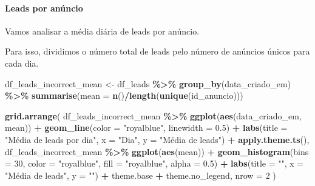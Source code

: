 \documentclass[
]{article}
\newenvironment{Shaded}{\begin{snugshade}}{\end{snugshade}}
\newcommand{\AttributeTok}[1]{\textcolor[rgb]{0.13,0.29,0.53}{#1}}
\newcommand{\DecValTok}[1]{\textcolor[rgb]{0.00,0.00,0.81}{#1}}
\newcommand{\FloatTok}[1]{\textcolor[rgb]{0.00,0.00,0.81}{#1}}
\newcommand{\FunctionTok}[1]{\textcolor[rgb]{0.13,0.29,0.53}{\textbf{#1}}}
\newcommand{\NormalTok}[1]{#1}
\newcommand{\OtherTok}[1]{\textcolor[rgb]{0.56,0.35,0.01}{#1}}
\newcommand{\SpecialCharTok}[1]{\textcolor[rgb]{0.81,0.36,0.00}{\textbf{#1}}}
\newcommand{\StringTok}[1]{\textcolor[rgb]{0.31,0.60,0.02}{#1}}
\begin{document}
\paragraph{Leads por anúncio}\label{leads-por-anuxfancio}

Vamos analisar a média diária de leads por anúncio.

Para isso, dividimos o número total de leads pelo número de anúncios
únicos para cada dia.

\begin{Shaded}
\begin{Highlighting}[]
\NormalTok{df\_leads\_incorrect\_mean }\OtherTok{\textless{}{-}}\NormalTok{ df\_leads }\SpecialCharTok{\%\textgreater{}\%}
  \FunctionTok{group\_by}\NormalTok{(data\_criado\_em) }\SpecialCharTok{\%\textgreater{}\%}
  \FunctionTok{summarise}\NormalTok{(}\AttributeTok{mean =} \FunctionTok{n}\NormalTok{()}\SpecialCharTok{/}\FunctionTok{length}\NormalTok{(}\FunctionTok{unique}\NormalTok{(id\_anuncio)))}

\FunctionTok{grid.arrange}\NormalTok{(}
\NormalTok{  df\_leads\_incorrect\_mean }\SpecialCharTok{\%\textgreater{}\%}
    \FunctionTok{ggplot}\NormalTok{(}\FunctionTok{aes}\NormalTok{(data\_criado\_em, mean)) }\SpecialCharTok{+}
    \FunctionTok{geom\_line}\NormalTok{(}\AttributeTok{color =} \StringTok{"royalblue"}\NormalTok{, }\AttributeTok{linewidth =} \FloatTok{0.5}\NormalTok{) }\SpecialCharTok{+}
    \FunctionTok{labs}\NormalTok{(}\AttributeTok{title =} \StringTok{"Média de leads por dia"}\NormalTok{,}
         \AttributeTok{x =} \StringTok{"Dia"}\NormalTok{,}
         \AttributeTok{y =} \StringTok{"Média de leads"}\NormalTok{) }\SpecialCharTok{+}
    \FunctionTok{apply.theme.ts}\NormalTok{(),}
\NormalTok{  df\_leads\_incorrect\_mean }\SpecialCharTok{\%\textgreater{}\%}
    \FunctionTok{ggplot}\NormalTok{(}\FunctionTok{aes}\NormalTok{(mean)) }\SpecialCharTok{+}
    \FunctionTok{geom\_histogram}\NormalTok{(}\AttributeTok{bins =} \DecValTok{30}\NormalTok{, }\AttributeTok{color =} \StringTok{"royalblue"}\NormalTok{, }\AttributeTok{fill =} \StringTok{"royalblue"}\NormalTok{, }\AttributeTok{alpha =} \FloatTok{0.5}\NormalTok{) }\SpecialCharTok{+}
    \FunctionTok{labs}\NormalTok{(}\AttributeTok{title =} \StringTok{""}\NormalTok{,}
         \AttributeTok{x =} \StringTok{"Média de leads"}\NormalTok{,}
         \AttributeTok{y =} \StringTok{""}\NormalTok{) }\SpecialCharTok{+}
\NormalTok{    theme.base }\SpecialCharTok{+}\NormalTok{ theme.no\_legend,}
  \AttributeTok{nrow =} \DecValTok{2}
\NormalTok{)}
\end{Highlighting}
\end{Shaded}
\end{document}
